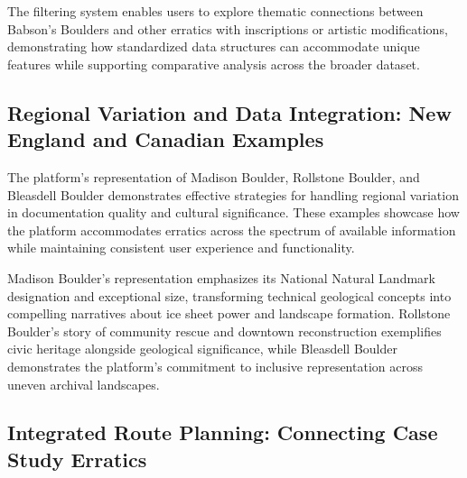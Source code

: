The filtering system enables users to explore thematic connections between Babson's Boulders and other erratics with inscriptions or artistic modifications, demonstrating how standardized data structures can accommodate unique features while supporting comparative analysis across the broader dataset.

\subsection{Regional Variation and Data Integration: New England and Canadian Examples}
\label{subsec:regional_variation}

The platform's representation of Madison Boulder, Rollstone Boulder, and Bleasdell Boulder demonstrates effective strategies for handling regional variation in documentation quality and cultural significance. These examples showcase how the platform accommodates erratics across the spectrum of available information while maintaining consistent user experience and functionality.

Madison Boulder's representation emphasizes its National Natural Landmark designation and exceptional size, transforming technical geological concepts into compelling narratives about ice sheet power and landscape formation. Rollstone Boulder's story of community rescue and downtown reconstruction exemplifies civic heritage alongside geological significance, while Bleasdell Boulder demonstrates the platform's commitment to inclusive representation across uneven archival landscapes.


\subsection{Integrated Route Planning: Connecting Case Study Erratics}
\label{subsec:integrated_route_planning}

